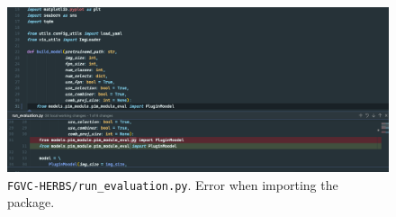 \documentclass[twocolumn]{extarticle}
\begin{document}
\begin{figure}[H]
\centering
\includegraphics[width=0.95\linewidth]{figure/evalbug}
\caption{\texttt{FGVC-HERBS/run\_evaluation.py}. Error when importing the package.}
\label{fig:evalbug}
\end{figure}



\printbibliography
\end{document}
